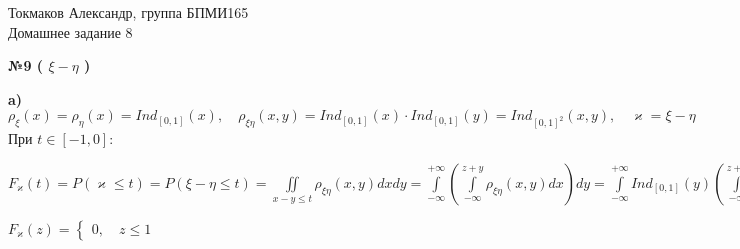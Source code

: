 \documentclass{article}
\newenvironment{task}{\begin{center}\fontsize{14}{14}\selectfont\bf}{\rm\fontsize{12}{12}\selectfont\end{center}}
\begin{document}
	\begin{center}
		Токмаков Александр, группа БПМИ165 \\
		Домашнее задание 8
	\end{center}
	
	\begin{task} 
		№9 ( $\xi - \eta$ )
	\end{task}
	\textbf{a)} $\rho_\xi(x) = \rho_\eta(x) = Ind_{[0, 1]}(x), \quad \rho_{\xi\eta}(x, y) = Ind_{[0, 1]}(x)\cdot Ind_{[0, 1]}(y) = Ind_{[0, 1]^2}(x, y), \quad \varkappa = \xi - \eta$ \\
	При $t \in [-1, 0]$:
	\begin{center}
		$F_\varkappa(t) = P(\varkappa \leq t) = P(\xi - \eta \leq t) = \iint\limits_{x - y \leq t} \rho_{\xi\eta}(x, y)dxdy 
		= \int\limits_{-\infty}^{+\infty} \left( \int\limits_{-\infty}^{z+y} \rho_{\xi\eta}(x, y) dx\right)dy
		= \int\limits_{-\infty}^{+\infty} Ind_{[0, 1]}(y) \left( \int\limits_{-\infty}^{z+y} Ind_{[0, 1]}(x) dx\right)dy
		= \int\limits_{-\infty}^{+\infty} Ind_{[0, 1]}(y) \left( \int\limits_{-\infty}^{z+y} Inddx\right)dy$
	\end{center}
	
	\begin{center}
		$F_\varkappa(z) = \begin{cases}
		0, \quad z \leq 1
		
		\end{cases}$
	\end{center}
	
	
	
	

	
\end{document}
